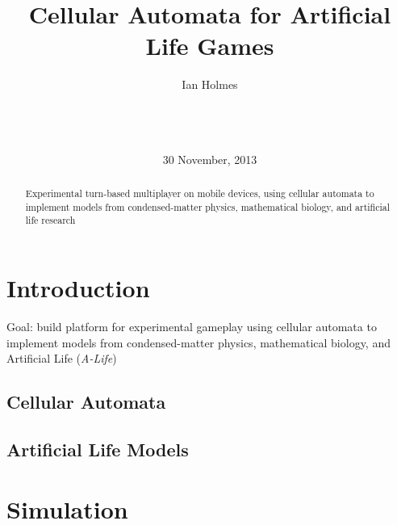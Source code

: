 \documentclass{acm_proc_article-sp}
\begin{document}
\title{Cellular Automata for Artificial Life Games}
\author{
\alignauthor
Ian Holmes\\
       \\
       \\
       \\
}
\date{30 November, 2013}

\maketitle
\begin{abstract}
Experimental turn-based multiplayer on mobile devices,
using cellular automata to implement models
from condensed-matter physics, mathematical biology,
and artificial life research
\end{abstract}



\section{Introduction}

Goal: 
build platform for experimental gameplay
using cellular automata to implement models
from condensed-matter physics, mathematical biology,
and Artificial Life ({\em A-Life})

\subsection{Cellular Automata}

\cite{Schiff2007}

\subsection{Artificial Life Models}

\cite{VonNeumannBook}

\cite{Conway}

\cite{Wireworld}

\cite{Langton}

\section{Simulation}
\end{document}
